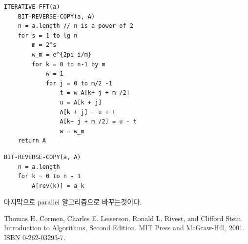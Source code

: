 \documentclass{oblivoir}
\begin{document}
\begin{lstlisting}[style = CStyle]
ITERATIVE-FFT(a)
    BIT-REVERSE-COPY(a, A)
    n = a.length // n is a power of 2
    for s = 1 to lg n
        m = 2^s
        w_m = e^{2pi i/m}
        for k = 0 to n-1 by m
            w = 1
            for j = 0 to m/2 -1
                t = w A[k+ j + m /2]
                u = A[k + j]
                A[k + j] = u + t
                A[k+ j + m /2] = u - t
                w = w_m
    return A
\end{lstlisting}

\begin{lstlisting}[style = CStyle]
BIT-REVERSE-COPY(a, A)
    n = a.length
    for k = 0 to n - 1
        A[rev(k)] = a_k
\end{lstlisting}


마지막으로 parallel 알고리즘으로 바꾸는것이다.


\begin{thebibliography}{}
    Thomas H. Cormen, Charles E. Leiserson, Ronald L. Rivest, and Clifford Stein. Introduction to Algorithms, Second Edition. MIT Press and McGraw-Hill, 2001. ISBN 0-262-03293-7.
\end{thebibliography}
\end{document}
